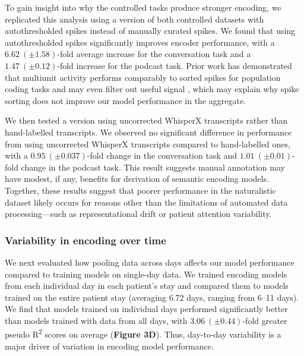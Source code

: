 \documentclass[pdflatex,sn-basic]{sn-jnl}%
\theoremstyle{thmstyleone}%
\theoremstyle{thmstyletwo}%
\theoremstyle{thmstylethree}%
\begin{document}
To gain insight into why the controlled tasks produce stronger encoding, we replicated this analysis using a version of both controlled datasets with autothresholded spikes instead of manually curated spikes. We found that using autothresholded spikes significantly improves encoder performance, with a $6.62~(\pm 1.58)$-fold average increase for the conversation task and a $1.47~(\pm 0.12)$-fold increase for the podcast task. Prior work has demonstrated that multiunit activity performs comparably to sorted spikes for population coding tasks and may even filter out useful signal \citep{bib60,bib61}, which may explain why spike sorting does not improve our model performance in the aggregate.

We then tested a version using uncorrected WhisperX transcripts rather than hand-labelled transcripts. We observed no significant difference in performance from using uncorrected WhisperX transcripts compared to hand-labelled ones, with a $0.95~(\pm 0.037)$-fold change in the conversation task and $1.01~(\pm 0.01)$-fold change in the podcast task. This result suggests manual annotation may have modest, if any, benefits for derivation of semantic encoding models. Together, these results suggest that poorer performance in the naturalistic dataset likely occurs for reasons other than the limitations of automated data processing---such as representational drift or patient attention variability.

\subsubsection{Variability in encoding over time}

We next evaluated how pooling data across days affects our model performance compared to training models on single-day data. We trained encoding models from each individual day in each patient's stay and compared them to models trained on the entire patient stay (averaging 6.72 days, ranging from 6--11 days). We find that models trained on individual days performed significantly better than models trained with data from all days, with $3.06~(\pm 0.44)$-fold greater pseudo R\textsuperscript{{2}} scores on average (\textbf{Figure 3D}). Thus, day-to-day variability is a major driver of variation in encoding model performance.
\end{document}
